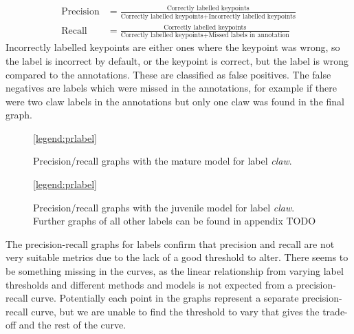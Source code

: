 \begin{align}
\text{Precision} &= \frac{\text{Correctly labelled keypoints}}{\text{Correctly labelled keypoints} + \text{Incorrectly labelled keypoints}}
\\[10pt]
\text{Recall} &= \frac{\text{Correctly labelled keypoints}}{\text{Correctly labelled keypoints} + \text{Missed labels in annotation}}
\end{align}
Incorrectly labelled keypoints are either ones where the keypoint was wrong, so the label is incorrect by default, or the keypoint is correct, but the label is wrong compared to the annotations. These are classified as false positives. The false negatives are labels which were missed in the annotations, for example if there were two claw labels in the annotations but only one claw was found in the final graph. 

\begin{figure}[H]
\centering
{}
\ref{legend:prlabel}
\caption{Precision/recall graphs with the mature model for label \textit{claw}.}
\end{figure}

\begin{figure}[H]
\centering
{}
\ref{legend:prlabel}
\caption{Precision/recall graphs with the juvenile model for label \textit{claw}. Further graphs of all other labels can be found in appendix TODO}
\end{figure}
\noindent
The precision-recall graphs for labels confirm that precision and recall are not very suitable metrics due to the lack of a good threshold to alter. There seems to be something missing in the curves, as the linear relationship from varying label thresholds and different methods and models is not expected from a precision-recall curve. Potentially each point in the graphs represent a separate precision-recall curve, but we are unable to find the threshold to vary that gives the trade-off and the rest of the curve. 
\n


%
%
%


